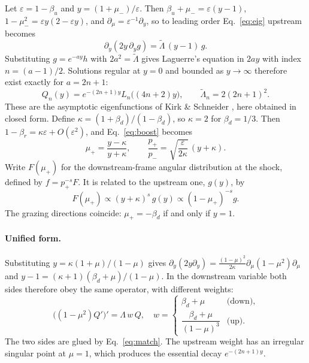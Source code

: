 \documentclass[aps,prd,twocolumn,superscriptaddress,nofootinbib,floatfix]{revtex4-2}
\newcommand{\bd}{\beta_d}
\newcommand{\bu}{\beta_u}
\begin{document}
Let $\varepsilon=1-\bu$ and $y=(1+\mu_-)/\varepsilon$. Then $\bu+\mu_-=\varepsilon(y-1)$,
$1-\mu_-^2=\varepsilon y(2-\varepsilon y)$, and $\partial_\mu=\varepsilon^{-1}\partial_y$, so to leading order
Eq.~\eqref{eq:eig} upstream becomes
\begin{equation}
\partial_y(2y\,\partial_y g)=\tilde\Lambda\,(y-1)\,g .
\end{equation}
Substituting $g=e^{-ay}h$ with $2a^2=\tilde\Lambda$ gives Laguerre's equation in $2ay$ with index
$n=(a-1)/2$. Solutions regular at $y=0$ and bounded as $y\to\infty$ therefore exist exactly for $a=2n+1$:
\begin{equation}
Q_n(y)=e^{-(2n+1)y}L_n\bigl((4n+2)y\bigr),\qquad \tilde\Lambda_n=2(2n+1)^2 .
\label{eq:laguerre}
\end{equation}
These are the asymptotic eigenfunctions of Kirk \& Schneider \cite{KirkSchneider1989,KGGA2000}, here obtained in
closed form. Define $\kappa=(1+\bd)/(1-\bd)$, so $\kappa=2$ for $\bd=1/3$. Then $1-\beta_r=\kappa\varepsilon+O(\varepsilon^2)$, and
Eq.~\eqref{eq:boost} becomes
\begin{equation}
\mu_+=\frac{y-\kappa}{y+\kappa},\qquad \frac{p_+}{p_-}=\sqrt{\frac{\varepsilon}{2\kappa}}\,(y+\kappa).
\end{equation}
Write $F(\mu_+)$ for the downstream-frame angular distribution at the shock, defined by $f=p_+^{-s}F$. It is
related to the upstream one, $g(y)$, by
\begin{equation}
F(\mu_+)\propto(y+\kappa)^s\,g(y)\propto(1-\mu_+)^{-s}g .
\label{eq:match}
\end{equation}
The grazing directions coincide: $\mu_+=-\bd$ if and only if $y=1$.

\paragraph{Unified form.}
Substituting $y=\kappa(1+\mu)/(1-\mu)$ gives
$\partial_y(2y\partial_y)=\frac{(1-\mu)^2}{2\kappa}\partial_\mu(1-\mu^2)\partial_\mu$ and
$y-1=(\kappa+1)(\bd+\mu)/(1-\mu)$. In the downstream variable both sides therefore obey the same operator, with
different weights:
\begin{equation}
\bigl((1-\mu^2)Q'\bigr)'=\Lambda\,w\,Q,\quad
w=\begin{cases}\bd+\mu & \text{(down)},\\[2pt] \dfrac{\bd+\mu}{(1-\mu)^{3}}&\text{(up)}.\end{cases}
\label{eq:unified}
\end{equation}
The two sides are glued by Eq.~\eqref{eq:match}. The upstream weight has an irregular singular point at
$\mu=1$, which produces the essential decay $e^{-(2n+1)y}$.
\end{document}
